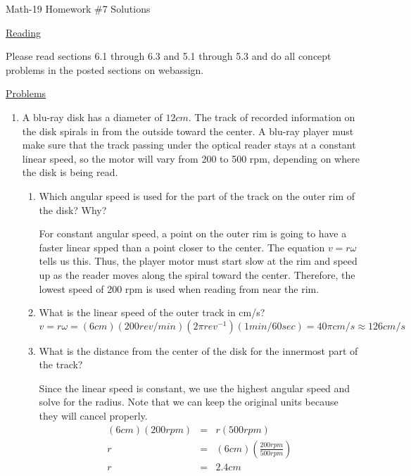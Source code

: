 \documentclass[letterpaper,12pt,fleqn]{article}
\newcommand{\w}{\omega}
\begin{document}
\begin{center}
\Large Math-19 Homework \#7 Solutions
\end{center}

\vspace{0.5in}

\underline{Reading}

Please read sections 6.1 through 6.3 and 5.1 through 5.3 and do all concept
problems in the posted sections on web\-assign.

\underline{Problems}

\begin{enumerate}
\item A blu-ray disk has a diameter of $12cm$. The track of recorded
information on the disk spirals in from the outside toward the center. A blu-ray
player must make sure that the track passing under the optical reader stays at
a constant linear speed, so the motor will vary from 200 to 500 rpm, depending
on where the disk is being read.
\begin{enumerate}
\item Which angular speed is used for the  part of the track on the outer rim
  of the disk? Why?

  \bigskip

  For constant angular speed, a point on the outer rim is going to have a
  faster linear spped than a point closer to the center. The equation $v=r\w$
  tells us this. Thus, the player motor must start slow at the rim and speed up
  as the reader moves along the spiral toward the center. Therefore, the lowest
  speed of 200 rpm is used when reading from near the rim.
  
  \bigskip
  
\item What is the linear speed of the outer track in cm/s?
  \[v=r\w=(6 cm)(200 rev/min)(2\pi rev^{-1})(1 min/60 sec)=40\pi cm/s
  \approx 126 cm/s\]
  
\item What is the distance from the center of the disk for the innermost part
  of the track?

  \bigskip

  Since the linear speed is constant, we use the highest angular speed and
  solve for the radius. Note that we can keep the original units because they
  will cancel properly.
  \begin{eqnarray}
    (6 cm)(200 rpm) &=& r(500 rpm) \\
    r &=& (6 cm)\left(\frac{200 rpm}{500 rpm}\right) \\
    r &=& 2.4 cm \\
  \end{eqnarray}
\end{enumerate}


\end{enumerate}
\end{document}
